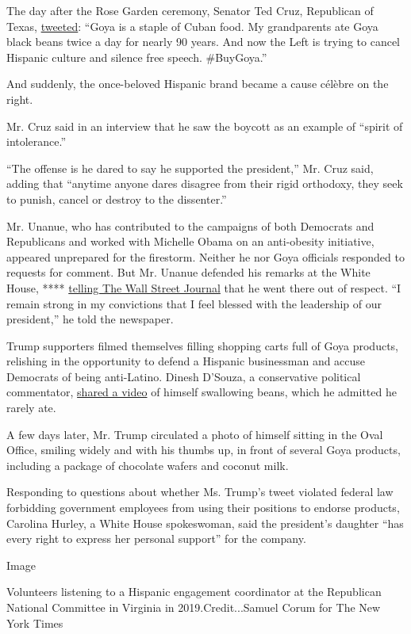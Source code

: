 The day after the Rose Garden ceremony, Senator Ted Cruz, Republican of
Texas,
\href{https://twitter.com/tedcruz/status/1281679899607142400}{tweeted}:
``Goya is a staple of Cuban food. My grandparents ate Goya black beans
twice a day for nearly 90 years. And now the Left is trying to cancel
Hispanic culture and silence free speech. \#BuyGoya.''

And suddenly, the once-beloved Hispanic brand became a cause célèbre on
the right.

Mr. Cruz said in an interview that he saw the boycott as an example of
``spirit of intolerance.''

``The offense is he dared to say he supported the president,'' Mr. Cruz
said, adding that ``anytime anyone dares disagree from their rigid
orthodoxy, they seek to punish, cancel or destroy to the dissenter.''

Mr. Unanue, who has contributed to the campaigns of both Democrats and
Republicans and worked with Michelle Obama on an anti-obesity
initiative, appeared unprepared for the firestorm. Neither he nor Goya
officials responded to requests for comment. But Mr. Unanue defended his
remarks at the White House, ****
\href{https://www.wsj.com/articles/goyas-ceo-softly-stands-his-ground-11595008616}{telling
The Wall Street Journal} that he went there out of respect. ``I remain
strong in my convictions that I feel blessed with the leadership of our
president,'' he told the newspaper.

Trump supporters filmed themselves filling shopping carts full of Goya
products, relishing in the opportunity to defend a Hispanic businessman
and accuse Democrats of being anti-Latino. Dinesh D'Souza, a
conservative political commentator,
\href{https://twitter.com/DineshDSouza/status/1282755880010817536}{shared
a video} of himself swallowing beans, which he admitted he rarely ate.

A few days later, Mr. Trump circulated a photo of himself sitting in the
Oval Office, smiling widely and with his thumbs up, in front of several
Goya products, including a package of chocolate wafers and coconut milk.

Responding to questions about whether Ms. Trump's tweet violated federal
law forbidding government employees from using their positions to
endorse products, Carolina Hurley, a White House spokeswoman, said the
president's daughter ``has every right to express her personal support''
for the company.

Image

Volunteers listening to a Hispanic engagement coordinator at the
Republican National Committee in Virginia in 2019.Credit...Samuel Corum
for The New York Times

